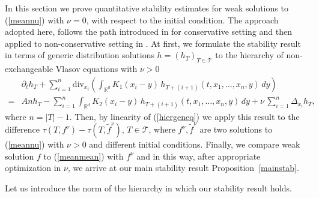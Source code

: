 \documentclass[10pt]{article}
\newcommand{\R}{\mathbb{R}}
\newcommand{\Tree}{\mathcal{T}}
\begin{document}
In this section we prove quantitative stability estimates for weak solutions  to (\ref{meannu}) with $\nu = 0$, with respect to the initial condition. The approach adopted here, follows the path introduced in \cite{JPS2025} for conservative setting and then applied to non-conservative setting in \cite{nasza}. At first, we formulate the stability result in terms of generic distribution solutions  $h=(h_T)_{T\in \Tree}$  to the  hierarchy of  non-exchangeable Vlasov equations with $\nu>0$
\begin{align}\label{hiergeneq}
 &\partial_t h_T+\sum_{i=1}^{n} \mbox{div}_{x_i}\left(\int_{\R^d} K_1(x_i-y)\,h_{T+(i+1)}(t,x_1,\ldots,x_{n},y)\,dy\right)\\ \nonumber 
 =&Anh_T -\sum_{i=1}^{n} \int_{\R^d} K_2(x_i-y)\,h_{T+(i+1)}(t,x_1,\ldots,x_{n},y)\,dy +  \nu\,\sum_{i=1}^{n} \Delta_{x_i} h_T,
\end{align}
where $n=|T|-1$. Then, by linearity of (\ref{hiergeneq}) we apply this result to the difference $\tau(T,f^\nu)-\tau(T,\tilde{f}^\nu)$, $T \in \mathcal{T}$, where $f^\nu,\tilde{f}^\nu$ are two solutions to (\ref{meannu}) with $\nu > 0 $ and different initial conditions.  Finally, we compare weak solution $f$ to (\ref{meanmean}) with $f^\nu$ and in this way, after appropriate optimization in $\nu$, we arrive at our main stability result Proposition~\ref{mainstab}. 

Let us introduce the norm of the hierarchy in which our stability result holds. 
\end{document}
